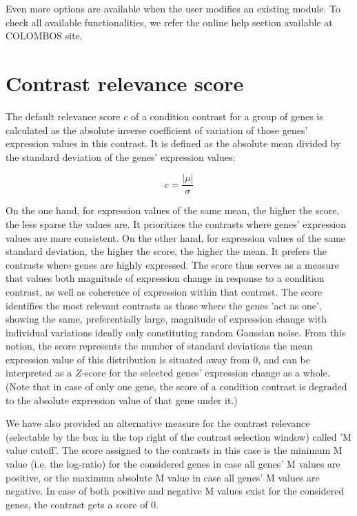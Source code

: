 Even more options are available when the user modifies an existing module.  To check all available functionalities, we refer the online help section available at COLOMBOS site.



\section{Contrast relevance score}\label{apd:contrast-score}

The default relevance score $c$ of a condition contrast for a group of genes is calculated as the absolute inverse coefficient of variation of those genes’ expression values in this contrast. It is defined as the absolute mean divided by the standard deviation of the genes’ expression values: 

\begin{equation}
c=\frac{|\mu|}{\sigma}
\end{equation}
 
On the one hand, for expression values of the same mean, the higher the score, the less sparse the values are. It prioritizes the contrasts where genes’ expression values are more consistent. On the other hand, for expression values of the same standard deviation, the higher the score, the higher the mean. It prefers the contrasts where genes are highly expressed. The score thus serves as a measure that values both magnitude of expression change in response to a condition contrast, as well as coherence of expression within that contrast. The score identifies the most relevant contrasts as those where the genes 'act as one', showing the same, preferentially large, magnitude of expression change with individual variations ideally only constituting random Gaussian noise. From this notion, the score represents the number of standard deviations the mean expression value of this distribution is situated away from $0$, and can be interpreted as a $Z$-score for the selected genes' expression change as a whole. (Note that in case of only one gene, the score of a condition contrast is degraded to the absolute expression value of that gene under it.)

We have also provided an alternative measure for the contrast relevance (selectable by the box in the top right of the contrast selection window) called 'M value cutoff'.  The score assigned to the contrasts in this case is the minimum M value (i.e. the log-ratio) for the considered genes in case all genes' M values are positive, or the maximum absolute M value in case all genes' M values are negative.  In case of both positive and negative M values exist for the considered genes, the contrast gets a score of 0.



